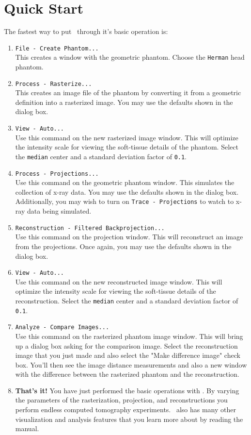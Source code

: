 \section{Quick Start}\label{IDH_QUICKSTART}
The fastest way to put \ctsim\ through it's basic operation is:
\begin{enumerate}\itemsep=0pt
\item \texttt{File - Create Phantom...} \\
This creates a window with the geometric phantom. Choose the \texttt{Herman} head phantom.
\item \texttt{Process - Rasterize...} \\
This creates an image file of the phantom by converting it from a
geometric definition into a rasterized image. You may use the defaults
shown in the dialog box.
\item \texttt{View - Auto...} \\
Use this command on the new rasterized image window. This will optimize the intensity scale for
viewing the soft-tissue details of the phantom. Select the \texttt{median} center and
a standard deviation factor of \texttt{0.1}.
\item \texttt{Process - Projections...} \\
Use this command on the geometric phantom window. This simulates the collection of x-ray
data. You may use the defaults shown in the dialog box. Additionally, you may wish to turn on
\texttt{Trace - Projections} to watch to x-ray data being simulated.
\item \texttt{Reconstruction - Filtered Backprojection...} \\
Use this command on the projection window. This will reconstruct an image
from the projections. Once again, you may use the defaults shown in the dialog box.
\item \texttt{View - Auto...} \\
Use this command on the new reconstructed image window. This will optimize the intensity scale for
viewing the soft-tissue details of the reconstruction. Select the \texttt{median} center and
a standard deviation factor of \texttt{0.1}.
\item \texttt{Analyze - Compare Images...} \\
Use this command on the rasterized phantom image window. This will bring up a dialog box
asking for the comparison image. Select the reconstruction image that you just made and also select the "Make difference image"
check box. You'll then see the image distance measurements and also a new window with the difference between the rasterized
phantom and the reconstruction.
\item \textbf{That's it!} You have just performed the basic operations with \ctsim. By varying the parameters of the rasterization,
projection, and reconstructions you perform endless computed tomography experiments. \ctsim\ also has many other visualization
and analysis features that you learn more about by reading the manual.
\end{enumerate}

